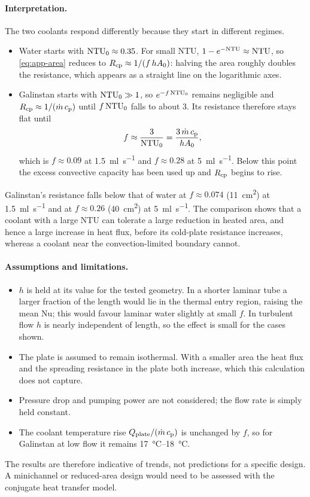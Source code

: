 \paragraph{Interpretation.} The two coolants respond differently because they
start in different regimes.
\begin{itemize}
  \item Water starts with $\mathrm{NTU}_0 \approx 0.35$. For small NTU,
    $1 - e^{-\mathrm{NTU}} \approx \mathrm{NTU}$, so \cref{eq:app-area} reduces to
    $R_{\mathrm{cp}} \approx 1/(f\,hA_0)$: halving the area roughly doubles the resistance,
    which appears as a straight line on the logarithmic axes.
  \item Galinstan starts with $\mathrm{NTU}_0 \gg 1$, so $e^{-f\,\mathrm{NTU}_0}$ remains
    negligible and $R_{\mathrm{cp}} \approx 1/(\dot{m}\,c_{\mathrm{p}})$ until $f\,\mathrm{NTU}_0$ falls to about
    3. Its resistance therefore stays flat until
    \begin{equation}
      f \approx \frac{3}{\mathrm{NTU}_0} = \frac{3\,\dot{m}\,c_{\mathrm{p}}}{hA_0},
    \end{equation}
    which is $f \approx 0.09$ at \SI{1.5}{\milli\litre\per\second} and
    $f \approx 0.28$ at \SI{5}{\milli\litre\per\second}. Below this point the
    excess convective capacity has been used up and $R_{\mathrm{cp}}$ begins to rise.
\end{itemize}
Galinstan's resistance falls below that of water at $f \approx 0.074$
(\SI{11}{\centi\metre\squared}) at \SI{1.5}{\milli\litre\per\second} and at
$f \approx 0.26$ (\SI{40}{\centi\metre\squared}) at
\SI{5}{\milli\litre\per\second}.
The comparison shows that a coolant with a large NTU can tolerate a large
reduction in heated area, and hence a large increase in heat flux, before its
cold-plate resistance increases, whereas a coolant near the convection-limited
boundary cannot.

\paragraph{Assumptions and limitations.}
\begin{itemize}
  \item $h$ is held at its value for the tested geometry. In a shorter laminar
    tube a larger fraction of the length would lie in the thermal entry region,
    raising the mean Nu; this would favour laminar water slightly at small $f$.
    In turbulent flow $h$ is nearly independent of length, so the effect is small
    for the cases shown.
  \item The plate is assumed to remain isothermal. With a smaller area the heat
    flux and the spreading resistance in the plate both increase, which this
    calculation does not capture.
  \item Pressure drop and pumping power are not considered; the flow rate is
    simply held constant.
  \item The coolant temperature rise $Q_{\mathrm{plate}}/(\dot{m}\,c_{\mathrm{p}})$ is unchanged by $f$,
    so for Galinstan at low flow it remains \SIrange{17}{18}{\celsius}.
\end{itemize}
The results are therefore indicative of trends, not predictions for a specific
design. A minichannel or reduced-area design would need to be assessed with the
conjugate heat transfer model.